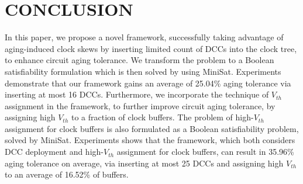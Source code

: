 \section{CONCLUSION}
\label{sec:conclude}
In this paper, we propose a novel framework, successfully taking advantage of aging-induced clock skews by inserting limited count of DCCs into the clock tree, to enhance circuit aging tolerance. We transform the problem to a Boolean satisfiability formulation which is then solved by using MiniSat. Experiments demonstrate that our framework gains an average of 25.04\% aging tolerance via inserting at most 16 DCCs. Furthermore, we incorporate the technique of $V_{th}$ assignment in the framework, to further improve circuit aging tolerance, by assigning high $V_{th}$ to a fraction of clock buffers. The problem of high-$V_{th}$ assignment for clock buffers is also formulated as a Boolean satisfiability problem, solved by MiniSat. Experiments shows that the framework, which both considers DCC deployment and high-$V_{th}$ assignment for clock buffers, can result in 35.96\% aging tolerance on average, via inserting at most 25 DCCs and assigning high $V_{th}$ to an average of 16.52\% of buffers.


